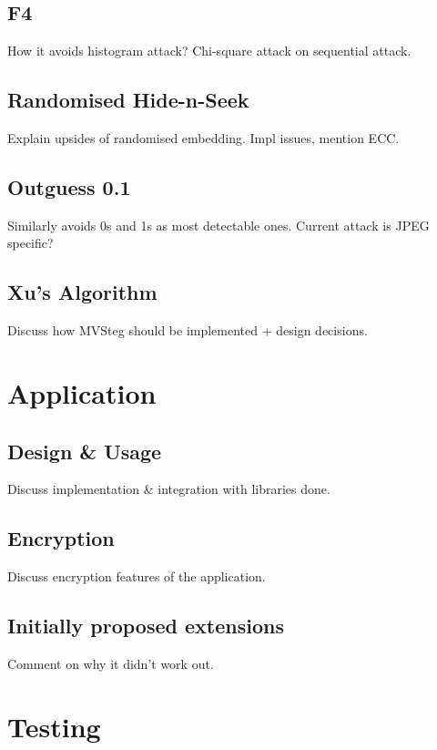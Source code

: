 \documentclass[12pt,british,twoside,notitlepage,usenames,dvipsnames,hypens,final]{report}
\numberwithin{equation}{section}
\numberwithin{figure}{section}
\begin{document}
\subsection{F4}

How it avoids histogram attack? Chi-square attack on sequential attack.

\subsection{Randomised Hide-n-Seek}

Explain upsides of randomised embedding. Impl issues, mention ECC. 

\subsection{Outguess 0.1}

Similarly avoids 0s and 1s as most detectable ones. Current attack is JPEG specific?

\subsection{Xu's Algorithm}
\label{xu-alg}

Discuss how MVSteg should be implemented + design decisions.

\section{Application}

\subsection{Design \& Usage}

Discuss implementation \& integration with libraries done.

\subsection{Encryption}
Discuss encryption features of the application.

\subsection{Initially proposed extensions}
Comment on why it didn't work out.


\section{Testing}
\end{document}
